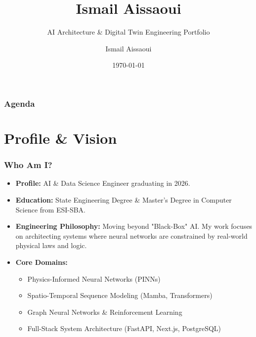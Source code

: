 \documentclass[aspectratio=169]{beamer}
\title[AI \& Data Science Engineer]{Ismail Aissaoui}
\subtitle{AI Architecture \& Digital Twin Engineering Portfolio}
\author{Ismail Aissaoui}
\institute[ESI-SBA]{National Higher School of Computer Science (ESI-SBA)}
\date{\today}
\begin{document}
\frame{\titlepage}

\begin{frame}
\frametitle{Agenda}
\tableofcontents
\end{frame}

\section{Profile \& Vision}
\begin{frame}
\frametitle{Who Am I?}
\begin{itemize}
    \item \textbf{Profile:} AI \& Data Science Engineer graduating in 2026.
    \item \textbf{Education:} State Engineering Degree \& Master's Degree in Computer Science from ESI-SBA.
    \item \textbf{Engineering Philosophy:} Moving beyond "Black-Box" AI. My work focuses on architecting systems where neural networks are constrained by real-world physical laws and logic.
    \item \textbf{Core Domains:} 
    \begin{itemize}
        \item Physics-Informed Neural Networks (PINNs)
        \item Spatio-Temporal Sequence Modeling (Mamba, Transformers)
        \item Graph Neural Networks \& Reinforcement Learning
        \item Full-Stack System Architecture (FastAPI, Next.js, PostgreSQL)
    \end{itemize}
\end{itemize}
\end{frame}
\end{document}
